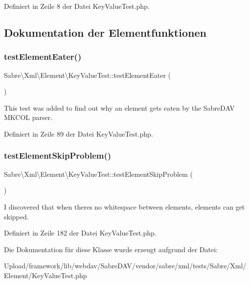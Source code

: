 Definiert in Zeile 8 der Datei Key\+Value\+Test.\+php.



\subsection{Dokumentation der Elementfunktionen}
\mbox{\label{class_sabre_1_1_xml_1_1_element_1_1_key_value_test_a54ac347f5901ec219b7b5c426f742643}} 
\subsubsection{\texorpdfstring{test\+Element\+Eater()}{testElementEater()}}
{\footnotesize\ttfamily Sabre\textbackslash{}\+Xml\textbackslash{}\+Element\textbackslash{}\+Key\+Value\+Test\+::test\+Element\+Eater (\begin{DoxyParamCaption}{ }\end{DoxyParamCaption})}

This test was added to find out why an element gets eaten by the Sabre\+D\+AV M\+K\+C\+OL parser. 

Definiert in Zeile 89 der Datei Key\+Value\+Test.\+php.

\mbox{\label{class_sabre_1_1_xml_1_1_element_1_1_key_value_test_a69173ced7292c40364f3ec9a3374b86c}} 
\subsubsection{\texorpdfstring{test\+Element\+Skip\+Problem()}{testElementSkipProblem()}}
{\footnotesize\ttfamily Sabre\textbackslash{}\+Xml\textbackslash{}\+Element\textbackslash{}\+Key\+Value\+Test\+::test\+Element\+Skip\+Problem (\begin{DoxyParamCaption}{ }\end{DoxyParamCaption})}

I discovered that when there\textquotesingle{}s no whitespace between elements, elements can get skipped. 

Definiert in Zeile 182 der Datei Key\+Value\+Test.\+php.



Die Dokumentation für diese Klasse wurde erzeugt aufgrund der Datei\+:\begin{DoxyCompactItemize}
\item 
Upload/framework/lib/webdav/\+Sabre\+D\+A\+V/vendor/sabre/xml/tests/\+Sabre/\+Xml/\+Element/Key\+Value\+Test.\+php\end{DoxyCompactItemize}
